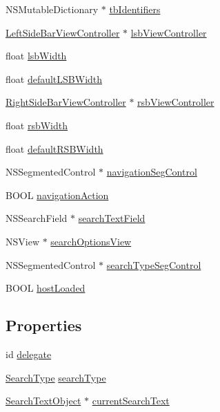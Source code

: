 \begin{DoxyCompactItemize}
N\-S\-Mutable\-Dictionary $\ast$ \hyperlink{interface_window_host_controller_a93d7f18be64aa1f313d2e619660cbef0}{tb\-Identifiers}
\item 
\hyperlink{interface_left_side_bar_view_controller}{Left\-Side\-Bar\-View\-Controller} $\ast$ \hyperlink{interface_window_host_controller_a8fe05988327a9d0052a364bdb8b87fbe}{lsb\-View\-Controller}
\item 
float \hyperlink{interface_window_host_controller_a7cf08d1ac134e40bbf4e3cb66bea3826}{lsb\-Width}
\item 
float \hyperlink{interface_window_host_controller_a97974e94978fcc8ac5e90a1610cc6409}{default\-L\-S\-B\-Width}
\item 
\hyperlink{interface_right_side_bar_view_controller}{Right\-Side\-Bar\-View\-Controller} $\ast$ \hyperlink{interface_window_host_controller_a94b9e7c3de9a1abc5b715ac6bc182d2a}{rsb\-View\-Controller}
\item 
float \hyperlink{interface_window_host_controller_a64fd8d11fec8191eab3933f2d94569f2}{rsb\-Width}
\item 
float \hyperlink{interface_window_host_controller_ae6e99d228c278105d6e55ed4233d381f}{default\-R\-S\-B\-Width}
\item 
N\-S\-Segmented\-Control $\ast$ \hyperlink{interface_window_host_controller_a9f56cb307817974d630b327988d8e4dc}{navigation\-Seg\-Control}
\item 
B\-O\-O\-L \hyperlink{interface_window_host_controller_a6b49eef36496ce6c7de7a10b79b0ec04}{navigation\-Action}
\item 
N\-S\-Search\-Field $\ast$ \hyperlink{interface_window_host_controller_adc341adfa3b6e061f59727f2a436e343}{search\-Text\-Field}
\item 
N\-S\-View $\ast$ \hyperlink{interface_window_host_controller_a510695160a6c785a547d4c728a328212}{search\-Options\-View}
\item 
N\-S\-Segmented\-Control $\ast$ \hyperlink{interface_window_host_controller_af1ca6d59e96cd2aa1180d70667ee2047}{search\-Type\-Seg\-Control}
\item 
B\-O\-O\-L \hyperlink{interface_window_host_controller_a8beaf7d7571e92e333c70e6b192ca551}{host\-Loaded}
\end{DoxyCompactItemize}
\subsection*{Properties}
\begin{DoxyCompactItemize}
\item 
id \hyperlink{interface_window_host_controller_a8d9332fcd23523b1e2520b8765577423}{delegate}
\item 
\hyperlink{_indexer_8h_a15cc00b2ac3048d3b89959ced9ba0520}{Search\-Type} \hyperlink{interface_window_host_controller_ac3a1fa49924063258d425f116eb8b687}{search\-Type}
\item 
\hyperlink{interface_search_text_object}{Search\-Text\-Object} $\ast$ \hyperlink{interface_window_host_controller_a4175731facced9b2f4065873b09674b8}{current\-Search\-Text}
\end{DoxyCompactItemize}


